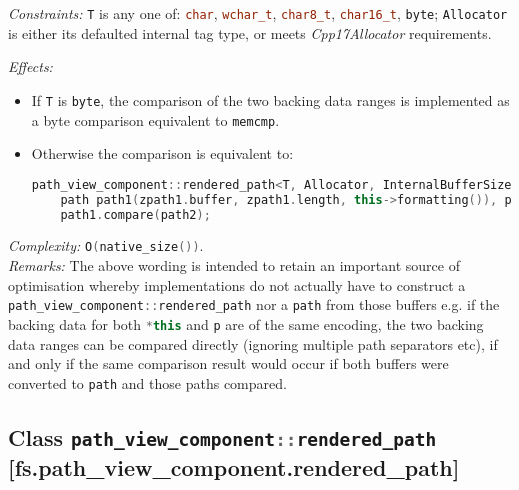 \documentclass[11pt]{article}
\newcommand{\code}[2][cpp]{\lstinline[language=#1,basicstyle=\small\ttfamily]{#2}}
\newcommand{\desc}[1]{\textit{#1}}
\newcommand{\constraints}{\desc{Constraints: }}
\newcommand{\effects}{\desc{Effects: }}
\newcommand{\remarks}{\desc{Remarks: }}
\newcommand{\complexity}{\desc{Complexity: }}
\begin{document}
\constraints \code{T} is any one of: \code{char}, \code{wchar_t}, \code{char8_t}, \code{char16_t}, \code{byte}; \code{Allocator} is either its defaulted internal tag type, or meets \emph{Cpp17Allocator} requirements.

\effects
\begin{itemize}
    \item If \code{T} is \code{byte}, the comparison of the two backing data ranges is implemented as a byte comparison equivalent to \code{memcmp}.
    \item Otherwise the comparison is equivalent to:
    \begin{lstlisting}[language=cpp]
    path_view_component::rendered_path<T, Allocator, InternalBufferSize> zpath1(*this), zpath2(p);
    path path1(zpath1.buffer, zpath1.length, this->formatting()), path2(zpath2.buffer, zpath2.length, p.formatting());
    path1.compare(path2);
    \end{lstlisting}
\end{itemize}

\complexity \code{O(native_size())}.\\

\remarks{The above wording is intended to retain an important source of optimisation whereby implementations do not actually have to construct a \code{path_view_component::rendered_path} nor a \code{path} from those buffers e.g. if the backing data for both \code{*this} and \code{p} are of the same encoding, the two backing data ranges can be compared directly (ignoring multiple path separators etc), if and only if the same comparison result would occur if both buffers were converted to \code{path} and those paths compared.}


\subsection*{Class \code{path_view_component::rendered_path} [fs.path\_view\_component.rendered\_path]}
\end{document}
